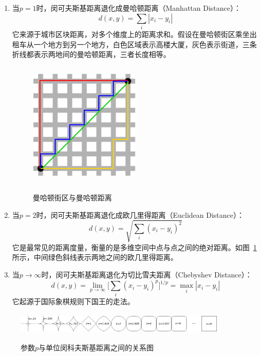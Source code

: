 \begin{enumerate}
  \item 当$p=1$时，闵可夫斯基距离退化成曼哈顿距离（Manhattan Distance）：
      \begin{equation}\label{eq:manhattan}
        d(x,y) = \sum_i |x_i-y_i|
      \end{equation}
  它来源于城市区块距离，对多个维度上的距离求和。假设在曼哈顿街区乘坐出租车从一个地方到另一个地方，白色区域表示高楼大厦，灰色表示街道，三条折线都表示两地间的曼哈顿距离，三者长度相等。
  \begin{figure}[htbp]
    \centering
    \includegraphics[width=0.5\textwidth, height=6cm]{figures/ManhattanBlock.eps}\\
    \caption{曼哈顿街区与曼哈顿距离}\label{fig:manhattanblock}
  \end{figure}
  \item 当$p=2$时，闵可夫斯基距离退化成欧几里得距离（Euclidean Distance）：
      \begin{equation}\label{eq:euclidean}
        d(x,y)=\sqrt {\sum\limits_i (x_i-y_i)^2}
      \end{equation}
  它是最常见的距离度量，衡量的是多维空间中点与点之间的绝对距离。如图~\ref{fig:manhattanblock}所示，中间绿色斜线表示两地之间的欧几里得距离。
  \item 当$p\rightarrow \infty$时，闵可夫斯基距离退化为切比雪夫距离（Chebyshev Distance）：
      \begin{equation}\label{eq:chebyshev}
        d(x,y)=\lim_{p \rightarrow \infty}\Big[\sum\limits_i (x_i-y_i)^p\Big]^{1/p}=\max_{i} |x_i-y_i|
      \end{equation}
  它起源于国际象棋规则下国王的走法。
\end{enumerate}
  \begin{figure}[htbp]
    \centering
    \includegraphics[width=0.9\textwidth, height=1cm]{figures/UnitMinkowskiDist.eps}\\
    \caption{参数$p$与单位闵科夫斯基距离之间的关系图}\label{fig:unitminkowski}
  \end{figure}

